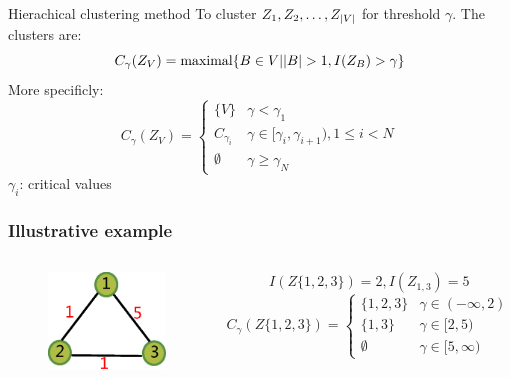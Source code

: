 \documentclass{beamer}
\DeclarePairedDelimiter\abs{\lvert}{\rvert}
\begin{document}
\begin{frame}{Hierachical clustering method}
To cluster $Z_1, Z_2, \dots, Z_{\abs{V}}$ for threshold $\gamma$.
The clusters are:
\begin{equation}
C_{\gamma}(Z_V) = \textrm{maximal}\{ B \in V \vert \abs{B} > 1, I(Z_B) > \gamma \}
\end{equation}
More specificly:
\begin{equation*}
C_{\gamma}(Z_V) = \begin{cases}
\{V\} & \gamma < \gamma_1 \\
C_{\gamma_i} & \gamma \in [\gamma_i, \gamma_{i+1}), 1\leq i < N \\
\emptyset & \gamma \geq \gamma_N
\end{cases}
\end{equation*}
$\gamma_i$: \alert{critical values}
\end{frame}
\begin{frame}
\frametitle{Illustrative example}
\begin{columns}
\column{4cm}
\begin{figure}
\includegraphics[width=4cm]{pic/example.eps}
\end{figure}
\column{6cm}
\begin{equation*}
I(Z\{1,2,3\}) = 2, I(Z_{1,3}) = 5
\end{equation*}
\begin{equation*}
C_{\gamma}(Z\{1,2,3\}) = \begin{cases}
\{1,2,3\} & \gamma \in (-\infty, 2) \\
\{1, 3\} & \gamma \in [2, 5) \\
\emptyset & \gamma \in [5, \infty)
\end{cases}
\end{equation*}
\end{columns}
\end{frame}
\end{document}
